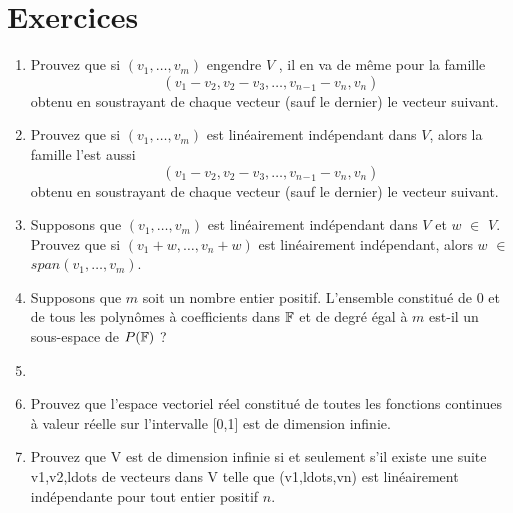 \documentclass[12pt]{book}
\begin{document}
\section*{Exercices}
\begin{enumerate}
\item Prouvez que si $(v_1,\ldots,v_m)$ engendre $V$ , il en va de même pour la famille
\begin{equation*}
 (v_1-v_2,v_2-v_3,\ldots,v_n{_-}_1-v_n,v_n)   
\end{equation*}
obtenu en soustrayant de chaque vecteur (sauf le dernier) le vecteur suivant.
\item Prouvez que si $(v_1,\ldots,v_m)$ est lin\'eairement ind\'ependant dans $V$, alors la famille l’est aussi
\begin{equation*}
 (v_1-v_2,v_2-v_3,\ldots,v_n{_-}_1-v_n,v_n)   
\end{equation*}
obtenu en soustrayant de chaque vecteur (sauf le dernier) le vecteur suivant.
\item Supposons que $(v_1,\ldots,v_m)$ est lin\'eairement ind\'ependant dans $V$ et $w$ $\in$ $V$.\\
Prouvez que si $(v_1 + w,\ldots,v_n +w)$ est lin\'eairement ind\'ependant, alors $w$ $\in$ $span(v_1,\ldots,v_m)$.
\item Supposons que $m$ soit un nombre entier positif. L'ensemble constitu\'e de $0$ et de tous les polynômes à coefficients dans $\mathbb{F}$ et de degr\'e \'egal \`a $m$ est-il un sous-espace de $P(\mathbb{F})$ ?
\item

\item Prouvez que l’espace vectoriel r\'eel constitu\'e de toutes les fonctions continues \`a valeur r\'eelle sur l’intervalle [0,1] est de dimension infinie.
\item Prouvez que V est de dimension infinie si et seulement s’il existe une suite v1,v2,ldots de vecteurs dans V telle que (v1,ldots,vn) est linéairement indépendante pour tout entier positif $n$.




















\end{enumerate}
\end{document}
